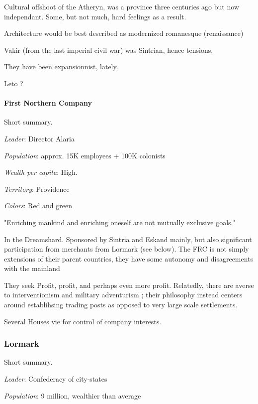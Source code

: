 Cultural offshoot of the Atheryn, was a province three centuries ago but now independant. Some, but not much, hard feelings as a result.

Architecture would be best described as modernized romanesque (renaissance)

Vakir (from the last imperial civil war) was Sintrian, hence tensions.

They have been expansionnist, lately.


Leto ?



\paragraph{First Northern Company}


Short summary.

\textit{Leader}: Director Alaria

\textit{Population}: approx. 15K employees + 100K colonists

\textit{Wealth per capita}: High.

\textit{Territory}: Providence
    
\textit{Colors}: Red and green


\begin{rpg-quotebox}
"Enriching mankind and enriching oneself are not mutually exclusive goals."
\end{rpg-quotebox}


In the Dreamshard. Sponsored by Sintria and Eskand mainly, but also significant participation from merchants from Lormark (see below).  
The FRC is not simply extensions of their parent countries, they have some autonomy and disagreements with the mainland


They seek Profit, profit, and perhaps even more profit. Relatedly, there are averse to interventionism and military adventurism ; their philosophy instead centers around establihsing trading posts as opposed to very large scale settlements.

Several Houses vie for control of company interests.



\subsubsection{Lormark}

Short summary.

\textit{Leader}: Confederacy of city-states

\textit{Population}: 9 million, wealthier than average

